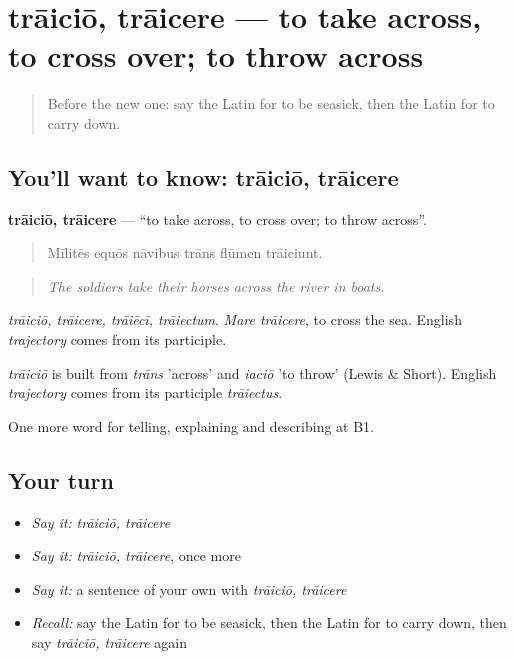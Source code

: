 \section[trāiciō, trāicere]{trāiciō, trāicere — to take across, to cross over; to throw across}

\label{lesson:LA-C440-traicio}



\begin{quote}
Before the new one: say the Latin for to be seasick, then the Latin for to carry down.
\end{quote}

\subsection*{You'll want to know: trāiciō, trāicere}
\textbf{trāiciō, trāicere} — \textquotedblleft{}to take across, to cross over; to throw across\textquotedblright{}.

\begin{quote}
Mīlitēs equōs nāvibus trāns flūmen trāiciunt.
\end{quote}

\begin{quote}
\emph{The soldiers take their horses across the river in boats.}
\end{quote}

\emph{trāiciō, trāicere, trāiēcī, trāiectum}. \emph{Mare trāicere}, to cross the sea. English \emph{trajectory} comes from its participle.

\begin{cousinweb}
\emph{trāiciō} is built from \emph{trāns} 'across' and \emph{iaciō} 'to throw' (Lewis \& Short). English \emph{trajectory} comes from its participle \emph{trāiectus}.
\end{cousinweb}

\begin{grammarlens}[title={What you've built}]
One more word for telling, explaining and describing at B1.
\end{grammarlens}

\subsection*{Your turn}
\begin{itemize}
\raggedright
  \item \emph{Say it:} \emph{trāiciō, trāicere}
  \item \emph{Say it:} \emph{trāiciō, trāicere}, once more
  \item \emph{Say it:} a sentence of your own with \emph{trāiciō, trāicere}
  \item \emph{Recall:} say the Latin for to be seasick, then the Latin for to carry down, then say \emph{trāiciō, trāicere} again
\end{itemize}


